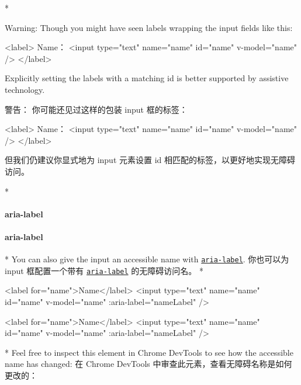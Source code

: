 \begin{paracol}{2} 
 
\switchcolumn[0]*%
\begin{vueQuoteWarn}{Warning:}
Though you might have seen labels wrapping the input fields like this:
\begin{codeHtml}
<label>
  Name：
  <input type="text" name="name" id="name" v-model="name" />
</label>
\end{codeHtml}
Explicitly setting the labels with a matching id is better supported by
assistive technology.
\end{vueQuoteWarn}
\switchcolumn
\begin{vueQuoteWarn}{警告：}
你可能还见过这样的包装 input 框的标签：
\begin{codeHtml}
<label>
  Name：
  <input type="text" name="name" id="name" v-model="name" />
</label>
\end{codeHtml}
但我们仍建议你显式地为 input 元素设置 id
相匹配的标签，以更好地实现无障碍访问。
\end{vueQuoteWarn}
\switchcolumn[0]*%
\paragraph{aria-label}
\switchcolumn
\paragraph{aria-label}
\switchcolumn[0]*%
You can also give the input an accessible name with
\href{https://developer.mozilla.org/en-US/docs/Web/Accessibility/ARIA/Attributes/aria-label}{\texttt{aria-label}}.
\switchcolumn
你也可以为 input 框配置一个带有
\href{https://developer.mozilla.org/en-US/docs/Web/Accessibility/ARIA/Attributes/aria-label}{\texttt{aria-label}}
的无障碍访问名。
\switchcolumn[0]*%
\begin{codeHtml}
<label for="name">Name</label>
<input
  type="text"
  name="name"
  id="name"
  v-model="name"
  :aria-label="nameLabel"
/>
\end{codeHtml}
\switchcolumn
\begin{codeHtml}
<label for="name">Name</label>
<input
  type="text"
  name="name"
  id="name"
  v-model="name"
  :aria-label="nameLabel"
/>
\end{codeHtml}
\switchcolumn[0]*%
Feel free to inspect this element in Chrome DevTools to see how the
accessible name has changed:
\switchcolumn
在 Chrome DevTools 中审查此元素，查看无障碍名称是如何更改的：
\end{paracol}

